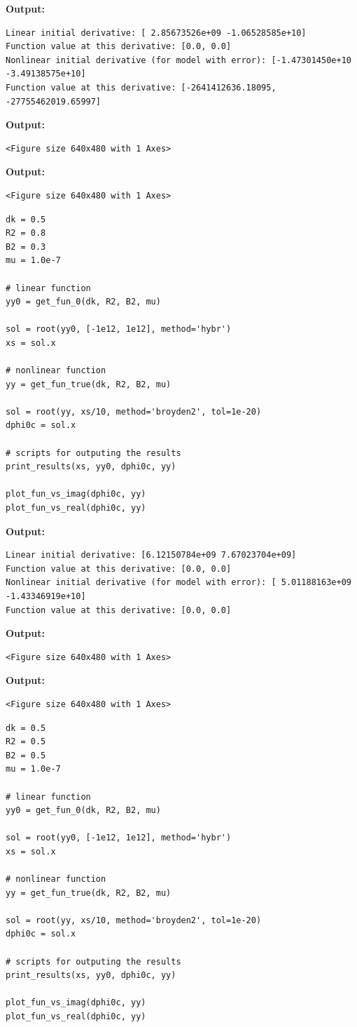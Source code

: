 \documentclass{article}
\begin{document}
\textbf{Output:}\begin{verbatim}
Linear initial derivative: [ 2.85673526e+09 -1.06528585e+10]
Function value at this derivative: [0.0, 0.0]
Nonlinear initial derivative (for model with error): [-1.47301450e+10 -3.49138575e+10]
Function value at this derivative: [-2641412636.18095, -27755462019.65997]

\end{verbatim}

\textbf{Output:}\begin{verbatim}
<Figure size 640x480 with 1 Axes>
\end{verbatim}

\textbf{Output:}\begin{verbatim}
<Figure size 640x480 with 1 Axes>
\end{verbatim}

\begin{lstlisting}
dk = 0.5
R2 = 0.8
B2 = 0.3
mu = 1.0e-7

# linear function
yy0 = get_fun_0(dk, R2, B2, mu)

sol = root(yy0, [-1e12, 1e12], method='hybr')
xs = sol.x

# nonlinear function
yy = get_fun_true(dk, R2, B2, mu)

sol = root(yy, xs/10, method='broyden2', tol=1e-20)
dphi0c = sol.x

# scripts for outputing the results
print_results(xs, yy0, dphi0c, yy)

plot_fun_vs_imag(dphi0c, yy)
plot_fun_vs_real(dphi0c, yy)\end{lstlisting}

\textbf{Output:}\begin{verbatim}
Linear initial derivative: [6.12150784e+09 7.67023704e+09]
Function value at this derivative: [0.0, 0.0]
Nonlinear initial derivative (for model with error): [ 5.01188163e+09 -1.43346919e+10]
Function value at this derivative: [0.0, 0.0]

\end{verbatim}

\textbf{Output:}\begin{verbatim}
<Figure size 640x480 with 1 Axes>
\end{verbatim}

\textbf{Output:}\begin{verbatim}
<Figure size 640x480 with 1 Axes>
\end{verbatim}

\begin{lstlisting}
dk = 0.5
R2 = 0.5
B2 = 0.5
mu = 1.0e-7

# linear function
yy0 = get_fun_0(dk, R2, B2, mu)

sol = root(yy0, [-1e12, 1e12], method='hybr')
xs = sol.x

# nonlinear function
yy = get_fun_true(dk, R2, B2, mu)

sol = root(yy, xs/10, method='broyden2', tol=1e-20)
dphi0c = sol.x

# scripts for outputing the results
print_results(xs, yy0, dphi0c, yy)

plot_fun_vs_imag(dphi0c, yy)
plot_fun_vs_real(dphi0c, yy)\end{lstlisting}
\end{document}
